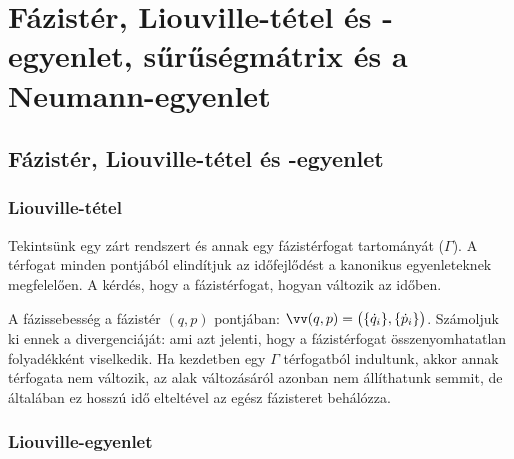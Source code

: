 \chapter{F\'azist\'er, Liouville-t\'etel és -egyenlet, s\H{u}r\H{u}s\'egm\'atrix és a Neumann-egyenlet}
 
 \section{Fázistér, Liouville-t\'etel és -egyenlet}
  
  \subsection{Liouville-tétel}
   
   Tekintsünk egy zárt rendszert és annak egy fázistérfogat tartományát ($\Gamma$).
   A térfogat minden pontjából elindítjuk az időfejlődést a kanonikus egyenleteknek megfelelően.
   A kérdés, hogy a fázistérfogat, hogyan változik az időben. 
   
   A fázissebesség a fázistér $(q,p)$ pontjában: $\vv(q,p)=\big(\{\dot{q}_i\},\{\dot{p}_i\}\big)$.
   Számoljuk ki ennek a divergenciáját:
   ami azt jelenti, hogy a fázistérfogat összenyomhatatlan folyadékként viselkedik.
   Ha kezdetben egy $\Gamma$ térfogatból indultunk, akkor annak térfogata nem változik, az alak változásáról azonban nem állíthatunk semmit, de általában ez hosszú idő elteltével az egész fázisteret behálózza.
   
  \subsection{Liouville-egyenlet}
   
